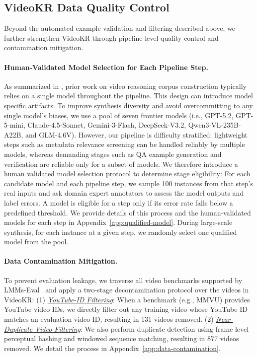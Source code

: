 \documentclass{llmxive}
\providecommand{\eg}{e.g.,\xspace}
\providecommand{\ie}{i.e.,\xspace}
\providecommand{\data}{VideoKR\xspace}
\providecommand{\ours}{VideoKR\xspace}
\begin{document}
\subsection{\data Data Quality Control}
\label{sec:data-quality}
Beyond the automated example validation and filtering described above, we further strengthen \data through pipeline-level quality control and contamination mitigation.

\vspace{-8pt}
\paragraph{Human-Validated Model Selection for Each Pipeline Step.}
As summarized in , prior work on video reasoning corpus construction typically relies on a single model throughout the pipeline. This design can introduce model specific artifacts.
To improve synthesis diversity and avoid overcommitting to any single model’s biases, we use a pool of seven frontier models (\ie GPT-5.2, GPT-5-mini, Claude-4.5-Sonnet, Gemini-3-Flash, DeepSeek-V3.2, Qwen3-VL-235B-A22B, and GLM-4.6V).
However, our pipeline is difficulty stratified: lightweight steps such as metadata relevance screening can be handled reliably by multiple models, whereas demanding stages such as QA example generation and verification are reliable only for a subset of models.
We therefore introduce a human validated model selection protocol to determine stage eligibility: For each candidate model and each pipeline step, we sample 100 instances from that step’s real inputs and ask domain expert annotators to assess the model outputs and label errors. A model is eligible for a step only if its error rate falls below a predefined threshold.
We provide details of this process and the human-validated models for each step in Appendix~\ref{app:qualified-model}. During large-scale synthesis, for each instance at a given step, we randomly select one qualified model from the pool.

\vspace{-8pt}
\paragraph{Data Contamination Mitigation.}
To prevent evaluation leakage, we traverse all video benchmarks supported by LMMs-Eval~\cite{lmms_eval} and apply a two-stage decontamination protocol over the videos in \ours:
(1) \underline{\emph{YouTube-ID Filtering}}: When a benchmark (\eg MMVU) provides YouTube video IDs, we directly filter out any training video whose YouTube ID matches an evaluation video ID, resulting in 131 videos removed.
(2) \underline{\emph{Near-Duplicate Video Filtering}}: 
We also perform duplicate detection using frame level perceptual hashing and windowed sequence matching, resulting in 877 videos removed. We detail the process in Appendix~\ref{app:data-contamination}.
\end{document}
